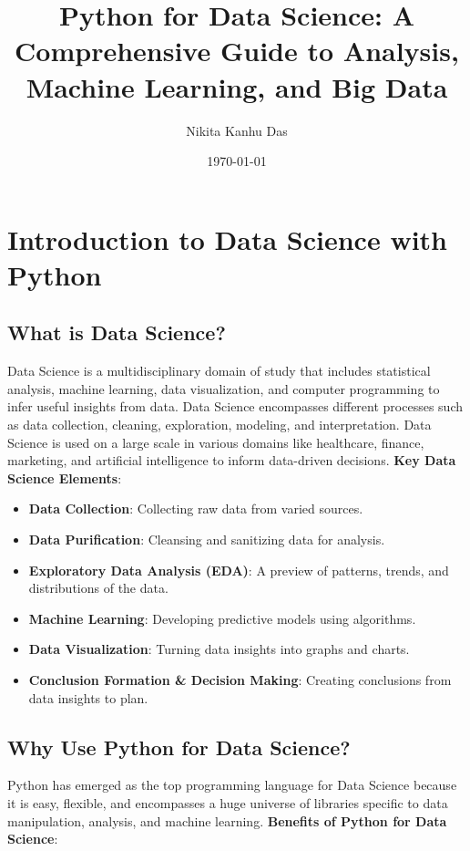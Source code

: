 \documentclass{article}
\title{\LARGE \textbf{Python for Data Science: A Comprehensive Guide to Analysis, Machine Learning, and Big Data}}
\author{Nikita Kanhu Das}
\date{\today}
\begin{document}
\maketitle
\tableofcontents
\newpage
\section{Introduction to Data Science with Python}

\subsection{What is Data Science?}
Data Science is a multidisciplinary domain of study that includes statistical analysis, machine learning, data visualization, and computer programming to infer useful insights from data. Data Science encompasses different processes such as data collection, cleaning, exploration, modeling, and interpretation. Data Science is used on a large scale in various domains like healthcare, finance, marketing, and artificial intelligence to inform data-driven decisions.
\newline
\newline
\textbf{Key Data Science Elements}:
\begin{itemize}
    \item \textbf{Data Collection}: Collecting raw data from varied sources.
    \item \textbf{Data Purification}: Cleansing and sanitizing data for analysis.
    \item \textbf{Exploratory Data Analysis (EDA)}: A preview of patterns, trends, and distributions of the data.
    \item \textbf{Machine Learning}: Developing predictive models using algorithms.
    \item \textbf{Data Visualization}: Turning data insights into graphs and charts.
    \item \textbf{Conclusion Formation \& Decision Making}: Creating conclusions from data insights to plan.
\end{itemize}
\subsection{Why Use Python for Data Science?}
Python has emerged as the top programming language for Data Science because it is easy, flexible, and encompasses a huge universe of libraries specific to data manipulation, analysis, and machine learning.
\newline
\newline
\textbf{Benefits of Python for Data Science}:
\end{document}
